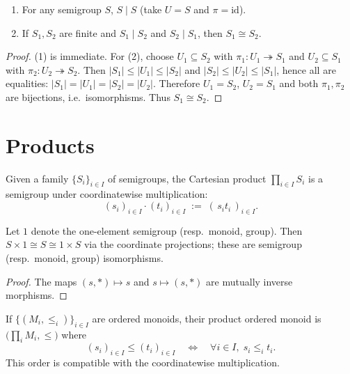 \begin{lemma}
\label{lem:division-reflexive-antisymmetric-finite}
\leavevmode
\begin{enumerate}
\item For any semigroup \(S\), \(S\mid S\) (take \(U=S\) and \(\pi=\mathrm{id}\)).
\item If \(S_1,S_2\) are finite and \(S_1\mid S_2\) and \(S_2\mid S_1\), then \(S_1\cong S_2\).
\end{enumerate}
\end{lemma}
\begin{proof}
(1) is immediate. For (2), choose \(U_1\subseteq S_2\) with \(\pi_1:U_1\twoheadrightarrow S_1\) and \(U_2\subseteq S_1\) with \(\pi_2:U_2\twoheadrightarrow S_2\). Then
\(|S_1|\le |U_1|\le |S_2|\) and \(|S_2|\le |U_2|\le |S_1|\), hence all are equalities:
\(|S_1|=|U_1|=|S_2|=|U_2|\). Therefore \(U_1=S_2\), \(U_2=S_1\) and both \(\pi_1,\pi_2\) are bijections, i.e.\ isomorphisms. Thus \(S_1\cong S_2\).
\end{proof}

\section {Products}

\begin{definition}
\label{def:semigroup-product}
Given a family \(\{S_i\}_{i\in I}\) of semigroups, the Cartesian product \(\prod_{i\in I} S_i\) is a semigroup under coordinatewise multiplication:
\[
(s_i)_{i\in I}\cdot (t_i)_{i\in I} \;:=\; (\,s_i t_i\,)_{i\in I}.
\]
\end{definition}

\begin{lemma}
\label{lem:one-is-identity-for-product}
Let \(1\) denote the one-element semigroup (resp.\ monoid, group). Then \(S\times 1\cong S\cong 1\times S\) via the coordinate projections; these are semigroup (resp.\ monoid, group) isomorphisms.
\end{lemma}
\begin{proof}
The maps \((s,\ast)\mapsto s\) and \(s\mapsto (s,\ast)\) are mutually inverse morphisms.
\end{proof}

\begin{definition}
\label{def:ordered-monoid-product}
If \(\{(M_i,\le_i)\}_{i\in I}\) are ordered monoids, their product ordered monoid is \(\big(\prod_i M_i,\le\big)\) where
\[
(s_i)_{i\in I}\le (t_i)_{i\in I}\quad\Longleftrightarrow\quad \forall i\in I,\; s_i\le_i t_i.
\]
This order is compatible with the coordinatewise multiplication.
\end{definition}

